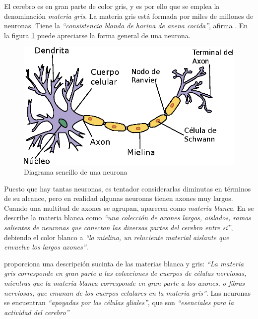 El cerebro es en gran parte de color gris, y es por ello que se emplea la denominación {\it materia gris}. La materia gris está formada por miles de millones de neuronas. Tiene la {\it ``consistencia blanda de harina de avena cocida''}, afirma \cite{Czerner2001}. En la figura \ref{diagrama_neurona} puede apreciarse la forma general de una neurona.


\begin{figure}[h]
  \begin{center}
    \includegraphics[scale=1]{images/neurona.eps}
    \caption{Diagrama sencillo de una neurona}
    \label{diagrama_neurona}
  \end{center}
\end{figure}


Puesto que hay tantas neuronas, es tentador considerarlas diminutas en términos de su alcance, pero en realidad algunas neuronas tienen axones muy largos. Cuando una multitud de axones se agrupan, aparecen como {\it materia blanca}. En \cite{Czerner2001} se describe la materia blanca como {\it ``una colección de axones largos, aislados, ramas salientes de neuronas que conectan las diversas partes del cerebro entre sí''}, debiendo el color blanco a {\it ``la mielina, un reluciente material aislante que envuelve los largos axones''}.

\cite{Damasio1994} proporciona una descripción sucinta de las materias blanca y gris: {\it ``La materia gris corresponde en gran parte a las colecciones de cuerpos de células nerviosas, mientras que la materia blanca corresponde en gran parte a los axones, o fibras nerviosas, que emanan de los cuerpos celulares en la materia gris''}. Las neuronas se encuentran {\it ``apoyadas por las células gliales''}, que son {\it ``esenciales para la actividad del cerebro''}

